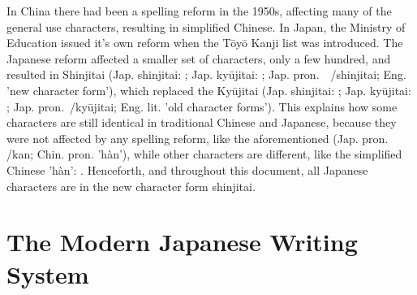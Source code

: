 In China there had been a spelling reform in the 1950s, affecting many of the
general use characters, resulting in simplified Chinese. In Japan, the Ministry
of Education issued it's own reform when the Tōyō Kanji list was introduced.
The Japanese reform affected a smaller set of characters, only a few 
hundred, and resulted in Shinjitai (Jap. shinjitai: ; 
Jap. kyūjitai: ;
Jap. pron.　/shinjitai; Eng. 'new character form'), 
which replaced the Kyūjitai 
(Jap. shinjitai: ; Jap. kyūjitai: ; 
Jap. pron.~/kyūjitai; Eng. lit. 'old character forms'). 
This explains how some characters are still identical in traditional Chinese and 
Japanese, because they were not affected by any spelling reform, like the 
aforementioned  (Jap. pron. /kan; Chin. pron. 'hàn'),
while other characters are different, like the simplified 
Chinese 'hàn': . Henceforth, and throughout this document, all Japanese characters are in the new character form shinjitai.

\section{The Modern Japanese Writing System}
\label{sec:modernjapanesewritingsystem}


